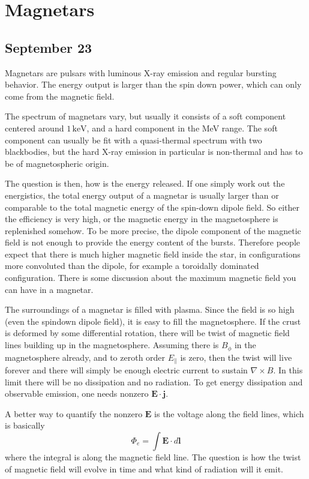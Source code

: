 \documentclass[letterpaper, 11pt]{article}
\numberwithin{equation}{section}
\numberwithin{figure}{section}
\begin{document}
\section{Magnetars}
\label{sec:magnetars}

\subsection{September 23}
\label{sec:sept-23}

Magnetars are pulsars with luminous X-ray emission and regular bursting behavior. The energy output is larger than the spin down power, which can only come from the magnetic field.

The spectrum of magnetars vary, but usually it consists of a soft component centered around $1\,\mathrm{keV}$, and a hard component in the MeV range. The soft component can usually be fit with a quasi-thermal spectrum with two blackbodies, but the hard X-ray emission in particular is non-thermal and has to be of magnetospheric origin.

The question is then, how is the energy released. If one simply work out the energistics, the total energy output of a magnetar is usually larger than or comparable to the total magnetic energy of the spin-down dipole field. So either the efficiency is very high, or the magnetic energy in the magnetosphere is replenished somehow. To be more precise, the dipole component of the magnetic field is not enough to provide the energy content of the bursts. Therefore people expect that there is much higher magnetic field inside the star, in configurations more convoluted than the dipole, for example a toroidally dominated configuration. There is some discussion about the maximum magnetic field you can have in a magnetar.

The surroundings of a magnetar is filled with plasma. Since the field is so high (even the spindown dipole field), it is easy to fill the magnetosphere. If the crust is deformed by some differential rotation, there will be twist of magnetic field lines building up in the magnetosphere. Assuming there is $B_{\phi}$ in the magnetosphere already, and to zeroth order $E_{\parallel}$ is zero, then the twist will live forever and there will simply be enough electric current to sustain $\nabla\times B$. In this limit there will be no dissipation and no radiation. To get energy dissipation and observable emission, one needs nonzero $\boldsymbol{E}\cdot \boldsymbol{j}$.

A better way to quantify the nonzero $\boldsymbol{E}$ is the voltage along the field lines, which is basically
\begin{equation}
    \label{eq:1}
    \Phi_e = \int \boldsymbol{E}\cdot d\boldsymbol{l}
\end{equation}
where the integral is along the magnetic field line. The question is how the twist of magnetic field will evolve in time and what kind of radiation will it emit.
\end{document}
